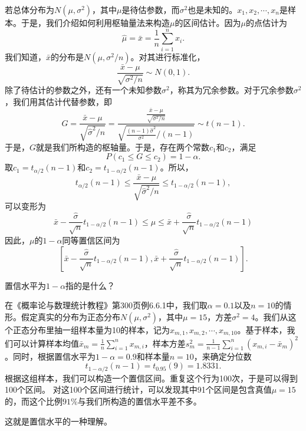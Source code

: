 \begin{example}
若总体分布为$N(\mu,\sigma^2)$，其中$\mu$是待估参数，而$\sigma^2$也是未知的。$x_1,x_2,\cdots,x_n$是样本。于是，我们介绍如何利用枢轴量法来构造$\mu$的区间估计。因为$\mu$的点估计为$$\hat{\mu} = \bar{x} = \frac{1}{n}\sum_{i=1}^n x_i.$$
我们知道，$\bar{x}$的分布是$N(\mu,\sigma^2/n)$。对其进行标准化，
    $$
     \frac{\bar{x}-\mu}{\sqrt{\sigma^2/n}} \sim N(0,1).
    $$
    除了待估计的参数之外，还有一个未知参数$\sigma^2$，称其为冗余参数。对于冗余参数$\sigma^2$，我们用其估计代替参数，即
    $$
     G = \frac{\bar{x}-\mu}{\sqrt{\hat{\sigma}^2/n}} = \frac{\frac{\bar{x}-\mu}{\sqrt{\sigma^2/n}}}{\sqrt{\frac{(n-1)\hat{\sigma}^2}{\sigma^2}/(n-1)}} \sim t(n-1).
    $$
    于是，$G$就是我们所构造的枢轴量。于是，存在两个常数$c_1$和$c_2$，满足
    $$
    P(c_1\leq G\leq c_2) = 1-\alpha.
    $$
    取$c_1 = t_{\alpha/2}(n-1)$和$c_2 = t_{1-\alpha/2}(n-1)$。所以，
$$
t_{\alpha/2}(n-1) \leq \frac{\bar{x}-\mu}{\sqrt{\hat{\sigma}^2/n}}\leq t_{1-\alpha/2}(n-1),
$$
可以变形为
$$
\bar{x}- \frac{\hat{\sigma}}{\sqrt{n}}t_{1-\alpha/2}(n-1) \leq \mu \leq \bar{x} + \frac{\hat{\sigma}}{\sqrt{n}}t_{1-\alpha/2}(n-1) 
$$
因此，$\mu$的$1-\alpha$同等置信区间为
$$
\left[\bar{x}- \frac{\hat{\sigma}}{\sqrt{n}}t_{1-\alpha/2}(n-1),\bar{x} + \frac{\hat{\sigma}}{\sqrt{n}}t_{1-\alpha/2}(n-1) \right].
$$
\end{example}

\begin{problem}
    置信水平为$1-\alpha$指的是什么？
\end{problem}
\begin{note}
    在《概率论与数理统计教程》第300页例6.6.1中，我们取$\alpha = 0.1$以及$n=10$的情形。假定真实的分布为正态分布$N(\mu,\sigma^2)$，其中$\mu = 15$，方差$\sigma^2 = 4$。我们从这个正态分布里抽一组样本量为10的样本，记为$x_{m,1},x_{m,2},\cdots,x_{m,10}$。基于样本，我们可以计算样本均值$\bar{x}_m = \frac{1}{n}\sum_{i=1}^n x_{m,i}$，样本方差$
    s_{m}^2 = \frac{1}{n-1}\sum_{i=1}^n (x_{m,i}-\bar{x}_m)^2$。同时，根据置信水平为$1-\alpha=0.9$和样本量$n=10$，来确定分位数
    $$
    t_{1-\alpha/2}(n-1) = t_{0.95}(9)=1.8331.
    $$
    根据这组样本，我们可以构造一个置信区间。重复这个行为100次，于是可以得到100个区间。
    对这100个区间进行统计，可以发现其中91个区间是包含真值$\mu=15$的，而这个比例$91\%$与我们所构造的置信水平差不多。

    这就是置信水平的一种理解。
   \begin{note}
        \vspace{3cm}
   \end{note}
   
    \end{note}

